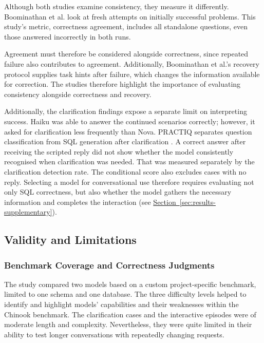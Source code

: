 Although both studies examine consistency, they measure it differently. 
Boominathan et al. look at fresh attempts on initially successful problems.
This study's metric, correctness agreement, includes all standalone questions, 
even those answered incorrectly in both runs.

Agreement must therefore be considered alongside correctness, 
since repeated failure also contributes to agreement.
Additionally, Boominathan et al.'s recovery protocol supplies task hints after failure,
which changes the information available for correction.
The studies therefore highlight the importance of evaluating consistency alongside correctness and recovery.

Additionally, the clarification findings expose a separate limit on interpreting success.
Haiku was able to answer the continued scenarios correctly; however, it asked for clarification less frequently than Nova.
PRACTIQ separates question classification from
SQL generation after clarification \citep{dong2025practiq}.
A correct answer after receiving the scripted reply did not show
whether the model consistently recognised when clarification was needed.
That was measured separately by the clarification detection rate.
The conditional score also excludes cases with no reply.
Selecting a model for conversational use therefore requires evaluating not only SQL correctness,
but also whether the model gathers the necessary information and completes the interaction
(see \hyperref[sec:results-supplementary]{Section~\ref*{sec:results-supplementary}}).

\subsection{Validity and Limitations}
\label{sec:discussion-validity}

\subsubsection{Benchmark Coverage and Correctness Judgments}

The study compared two models based on a custom project-specific benchmark,
limited to one schema and one database.
The three difficulty levels helped
to identify and highlight models' capabilities and their weaknesses
within the Chinook benchmark.
The clarification cases and the interactive episodes
were of moderate length and complexity.
Nevertheless, they were quite limited in their ability
to test longer conversations with repeatedly changing requests.

